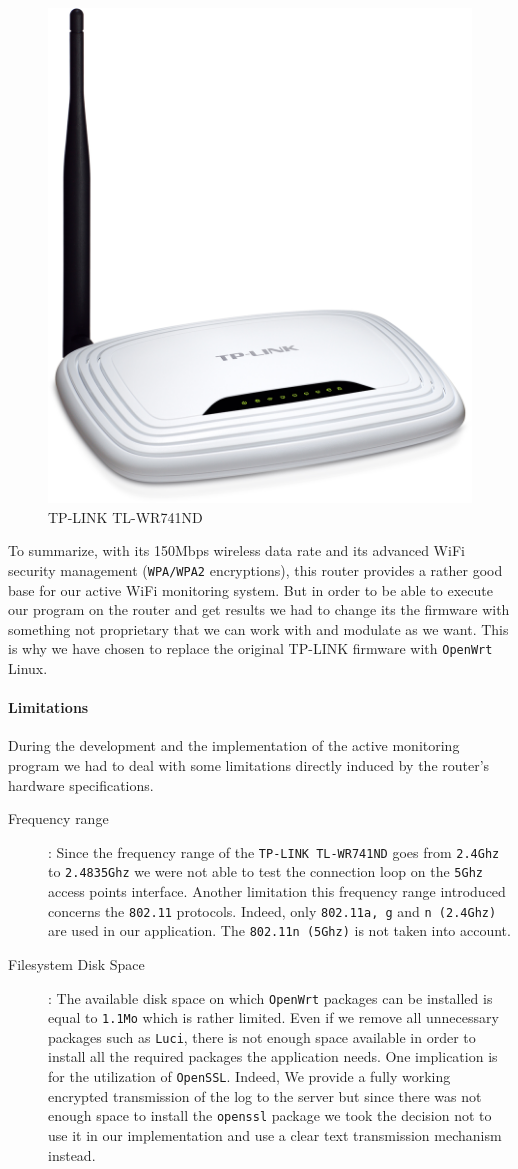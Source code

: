 \begin{figure}[H]
	\begin{center}
		\includegraphics[width=0.2\linewidth]{Pictures/chapter4/router.jpg}
		\caption{TP-LINK TL-WR741ND}
	\end{center}
\end{figure}

To summarize, with its 150Mbps wireless data rate and its advanced WiFi security management (\texttt{WPA/WPA2} encryptions), this router provides a rather good base for our active WiFi monitoring system. But in order to be able to execute our program on the router and get results we had to change its the firmware with something not proprietary that we can work with and modulate as we want. This is why we have chosen to replace the original TP-LINK firmware with \texttt{OpenWrt} Linux.

\paragraph*{Limitations}
During the development and the implementation of the active monitoring program we had to deal with some limitations directly induced by the router's hardware specifications.
\begin{description}
	\item [Frequency range]: Since the frequency range of the \texttt{TP-LINK TL-WR741ND} goes from \texttt{2.4Ghz} to \texttt{2.4835Ghz} we were not able to test the connection loop on the \texttt{5Ghz} access points interface. Another limitation this frequency range introduced concerns the \texttt{802.11} protocols. Indeed, only \texttt{802.11a, g} and \texttt{n (2.4Ghz)} are used in our application. The \texttt{802.11n (5Ghz)} is not taken into account. 

	\item [Filesystem Disk Space]: The available disk space on which \texttt{OpenWrt} packages can be installed is equal to \texttt{1.1Mo} which is rather limited. Even if we remove all unnecessary packages such as \texttt{Luci}, there is not enough space available in order to install all the required packages the application needs. One implication is for the utilization of \texttt{OpenSSL}. Indeed, We provide a fully working encrypted transmission of the log to the server but since there was not enough space to install the \texttt{openssl} package we took the decision not to use it in our implementation and use a clear text transmission mechanism instead.
\end{description}

